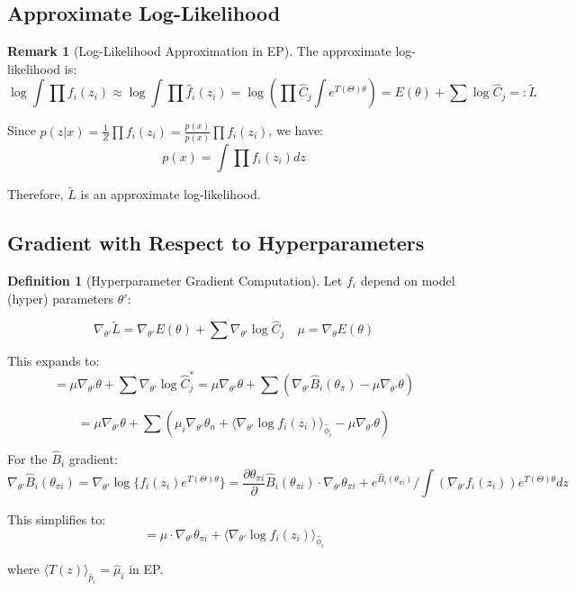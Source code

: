 \documentclass[12pt,a4paper]{article}
\theoremstyle{definition}
\newtheorem{definition}{Definition}[section]
\newtheorem{remark}{Remark}[section]
\begin{document}
\subsection{Approximate Log-Likelihood}

\begin{remark}[Log-Likelihood Approximation in EP]
The approximate log-likelihood is:
\[
\log \int \prod f_i(z_i) \approx \log \int \prod \hat{f}_i(z_i) = \log \left( \prod \hat{C}_j \int e^{T(\Theta)\theta} \right) = E(\theta) + \sum \log \hat{C}_j =: \tilde{L}
\]

Since $p(z|x) = \frac{1}{Z} \prod f_i(z_i) = \frac{p(x)}{p(x)} \prod f_i(z_i)$, we have:
\[
p(x) = \int \prod f_i(z_i) dz
\]

Therefore, $\tilde{L}$ is an approximate log-likelihood.
\end{remark}

\subsection{Gradient with Respect to Hyperparameters}

\begin{definition}[Hyperparameter Gradient Computation]
Let $f_i$ depend on model (hyper) parameters $\theta'$:

\[
\nabla_{\theta'} \tilde{L} = \nabla_{\theta'} E(\theta) + \sum \nabla_{\theta'} \log \hat{C}_j \quad \mu = \nabla_\theta E(\theta)
\]

This expands to:
\[
= \mu \nabla_{\theta'} \theta + \sum \nabla_{\theta'} \log \hat{C}_j^* = \mu \nabla_{\theta'} \theta + \sum (\nabla_{\theta'} \hat{B}_i(\theta_\pi) - \mu \nabla_{\theta'} \theta)
\]

\[
= \mu \nabla_{\theta'} \theta + \sum \left( \mu_i \nabla_{\theta'} \theta_n + \langle \nabla_{\theta'} \log f_i(z_i) \rangle_{\hat{\phi}_i} - \mu \nabla_{\theta'} \theta \right)
\]

For the $\hat{B}_i$ gradient:
\[
\nabla_{\theta'} \hat{B}_i(\theta_{\pi i}) = \nabla_{\theta'} \log \{ f_i(z_i) e^{T(\Theta)\theta} \} = \frac{\partial \theta_{\pi i}}{\partial} \hat{B}_i(\theta_{\pi i}) \cdot \nabla_{\theta'} \theta_{\pi i} + e^{\hat{B}_i(\theta_{\pi i})} / \int (\nabla_{\theta'} f_i(z_i)) e^{T(\Theta)\theta} dz
\]

This simplifies to:
\[
= \mu \cdot \nabla_{\theta'} \theta_{\pi i} + \langle \nabla_{\theta'} \log f_i(z_i) \rangle_{\hat{\phi}_i}
\]

where $\langle T(z) \rangle_{\hat{p}_i} = \hat{\mu}_i$ in EP.
\end{definition}
\end{document}
